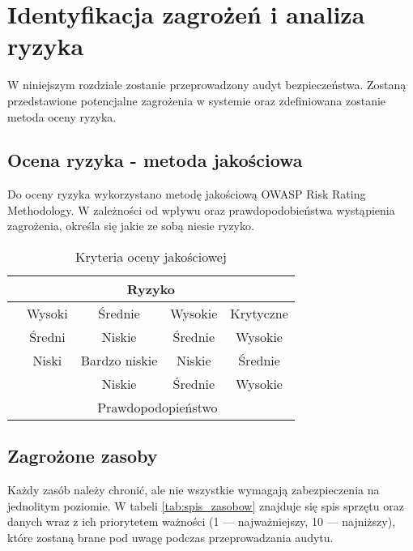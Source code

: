 \newpage\section{Identyfikacja zagrożeń \newline i analiza ryzyka}
W niniejszym rozdziale zostanie przeprowadzony audyt bezpieczeństwa. Zostaną przedstawione potencjalne zagrożenia w systemie oraz zdefiniowana zostanie metoda oceny ryzyka.

\subsection{Ocena ryzyka - metoda jakościowa}
Do oceny ryzyka wykorzystano metodę jakościową OWASP Risk Rating Methodology. W zależności od wpływu oraz prawdopodobieństwa wystąpienia zagrożenia, określa się jakie ze sobą niesie ryzyko. 
\begin{table}[!ht]
	\centering
	\caption{Kryteria oceny jakościowej}
	\label{ocenaRyzyka}
	\begin{tabular}{|c|c|c|c|c|}
		\hline 
		\multicolumn{5}{|c|}{Ryzyko}        \\ \hline
		\multirow{4}{*}{} & Wysoki  & \cellcolor{orange} Średnie     &\cellcolor{red}  Wysokie   & \cellcolor{pink} Krytyczne     \\ \cline{2-5} 
		Wpływ	  & Średni  & \cellcolor{yellow} Niskie    	 & \cellcolor{orange} Średnie    & \cellcolor{red}  Wysokie   \\ \cline{2-5}
		& Niski   & \cellcolor{green} Bardzo niskie &  \cellcolor{yellow} Niskie     & \cellcolor{orange} Średnie    \\ \cline{2-5}
		&     	& Niskie   			& Średnie    &  Wysokie    \\ \hline
		& \multicolumn{4}{c|}{Prawdopodopieństwo}  \\  \hline 
	\end{tabular}
\end{table}

\subsection{Zagrożone zasoby}
Każdy zasób należy chronić, ale nie wszystkie wymagają zabezpieczenia na jednolitym poziomie. W tabeli \ref{tab:spis_zasobow} znajduje się spis sprzętu oraz danych wraz z ich priorytetem  ważności (1 --- najważniejszy, 10 --- najniższy), które zostaną brane pod uwagę podczas przeprowadzania audytu. 

